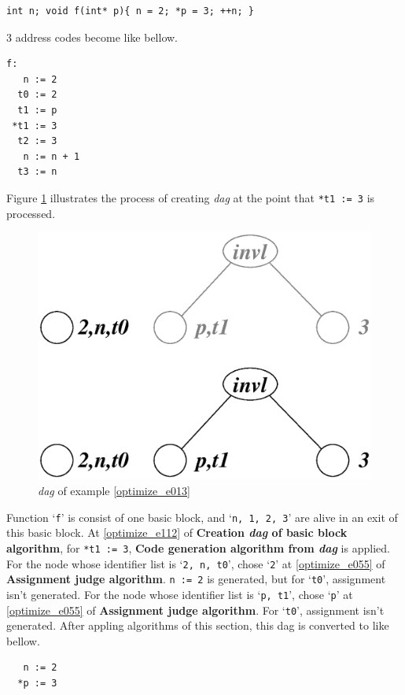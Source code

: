 \begin{Example}
\label{optimize_e013}
\begin{verbatim}
int n; void f(int* p){ n = 2; *p = 3; ++n; }
\end{verbatim}
3 address codes become like bellow.
\begin{verbatim}
f:
   n := 2
  t0 := 2
  t1 := p
 *t1 := 3
  t2 := 3
   n := n + 1
  t3 := n
\end{verbatim}
Figure \ref{optimize_e014} illustrates the process of creating
{\em dag} at the point that {\tt{*t1 := 3}} is processed.
\begin{figure}[htbp]
\begin{center}
\includegraphics[width=1.0\linewidth,height=0.729\linewidth]{opt004.eps}
\caption{{\em dag} of example \ref{optimize_e013}}
\label{optimize_e014}
\end{center}
\end{figure}

Function `{\tt{f}}' is consist of one basic block, and 
`{\tt{n, 1, 2, 3}}' are alive in an exit of this basic block.
At \ref{optimize_e112} of {\bf Creation {\em dag} of basic block algorithm},
for {\tt{*t1 := 3}},
{\bf Code generation algorithm from {\em dag}} is applied.
For the node whose identifier list is `{\tt{2, n, t0}}',
chose `{\tt{2}}'
at \ref{optimize_e055} of {\bf Assignment judge algorithm}.
{\tt{n := 2}} is generated, but for `{\tt{t0}}', 
assignment isn't generated.
For the node whose identifier list is `{\tt{p, t1}}',
chose `{\tt{p}}'
at \ref{optimize_e055} of {\bf Assignment judge algorithm}.
For `{\tt{t0}}', 
assignment isn't generated. 
After appling algorithms of this section,
this dag is converted to like bellow.
\begin{verbatim}
   n := 2
  *p := 3
\end{verbatim}
\end{Example}

